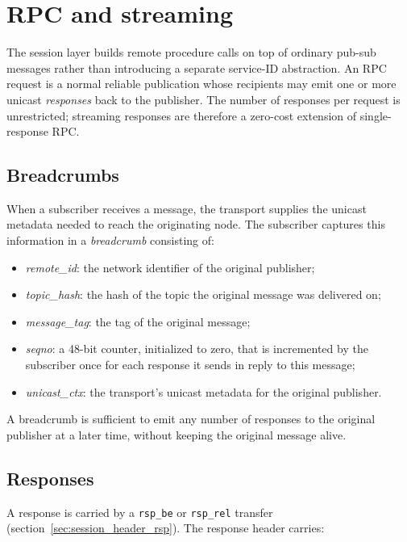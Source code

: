 \section{RPC and streaming}\label{sec:session_rpc}

The session layer builds remote procedure calls on top of ordinary pub-sub
messages rather than introducing a separate service-ID abstraction. An RPC
request is a normal reliable publication whose recipients may emit one or more
unicast \emph{responses} back to the publisher. The number of responses per
request is unrestricted; streaming responses are therefore a zero-cost
extension of single-response RPC.

\subsection{Breadcrumbs}

When a subscriber receives a message, the transport supplies the unicast
metadata needed to reach the originating node. The subscriber captures this
information in a \emph{breadcrumb} consisting of:

\begin{itemize}
    \item \textit{remote\_id}: the network identifier of the original
    publisher;
    \item \textit{topic\_hash}: the hash of the topic the original message
    was delivered on;
    \item \textit{message\_tag}: the tag of the original message;
    \item \textit{seqno}: a 48-bit counter, initialized to zero, that is
    incremented by the subscriber once for each response it sends in reply
    to this message;
    \item \textit{unicast\_ctx}: the transport's unicast metadata for the
    original publisher.
\end{itemize}

A breadcrumb is sufficient to emit any number of responses to the original
publisher at a later time, without keeping the original message alive.

\subsection{Responses}

A response is carried by a \texttt{rsp\_be} or \texttt{rsp\_rel} transfer
(section~\ref{sec:session_header_rsp}). The response header carries:

